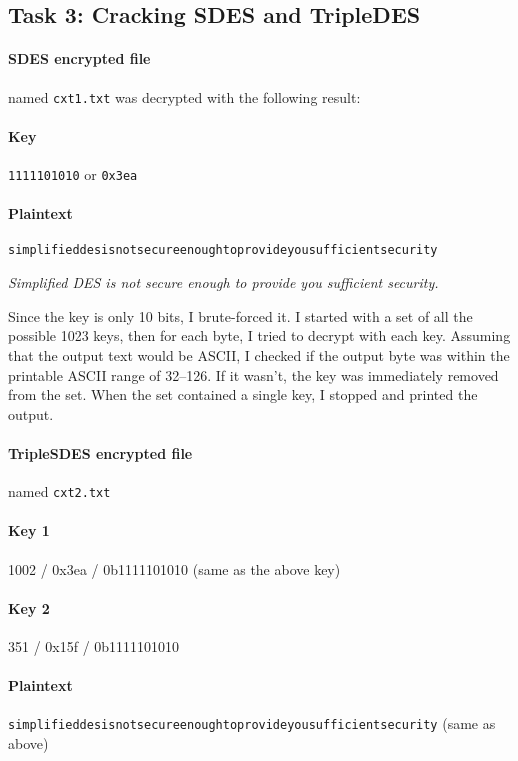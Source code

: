 \documentclass[a4paper,english,12pt]{article}
\begin{document}
\subsection{Task 3: Cracking SDES and TripleDES}

\paragraph{SDES encrypted file} named \texttt{cxt1.txt} was decrypted with the
following result:

\paragraph{Key} \texttt{1111101010} or \texttt{0x3ea}

\paragraph{Plaintext}
\texttt{simplifieddesisnotsecureenoughtoprovideyousufficientsecurity}

\begin{center}
\textit{Simplified DES is not secure enough to provide you sufficient security.}
\end{center}

Since the key is only 10 bits, I brute-forced it. I started with a set of all
the possible 1023 keys, then for each byte, I tried to decrypt with each key.
Assuming that the output text would be ASCII, I checked if the output byte was
within the printable ASCII range of 32--126. If it wasn't, the key was
immediately removed from the set. When the set contained a single key, I
stopped and printed the output.

\paragraph{TripleSDES encrypted file} named \texttt{cxt2.txt}

\paragraph{Key 1} 1002 / 0x3ea / 0b1111101010 (same as the above key)
\paragraph{Key 2} 351 / 0x15f / 0b1111101010
\paragraph{Plaintext}
\texttt{simplifieddesisnotsecureenoughtoprovideyousufficientsecurity} (same as
above)
\end{document}
